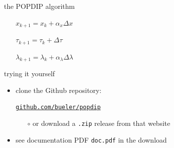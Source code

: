 \documentclass[10pt,hyperref,dvipsnames]{beamer}
\begin{document}
\begin{frame}{the \alert{POPDIP algorithm}}
\begin{itemize}
\begin{itemize}
\smallskip
    \item[] $x_{k+1} = x_k + \alpha_x \Delta x$

\smallskip
    \item[] $\tau_{k+1} = \tau_k + \Delta \tau$

\smallskip
    \item[] $\lambda_{k+1} = \lambda_k + \alpha_\lambda \Delta \lambda$
    \end{itemize}
\end{itemize}
\end{frame}


\begin{frame}{trying it yourself}

\begin{itemize}
\item clone the Github repository:

\begin{center}
\href{https://github.com/bueler/popdip}{\texttt{github.com/bueler/popdip}}
\end{center}

    \begin{itemize}
    \item[$\circ$] or download a \texttt{.zip} release from that website
    \end{itemize}

\item see documentation PDF \texttt{doc.pdf} in the download
\end{itemize}
\end{frame}
\end{document}

